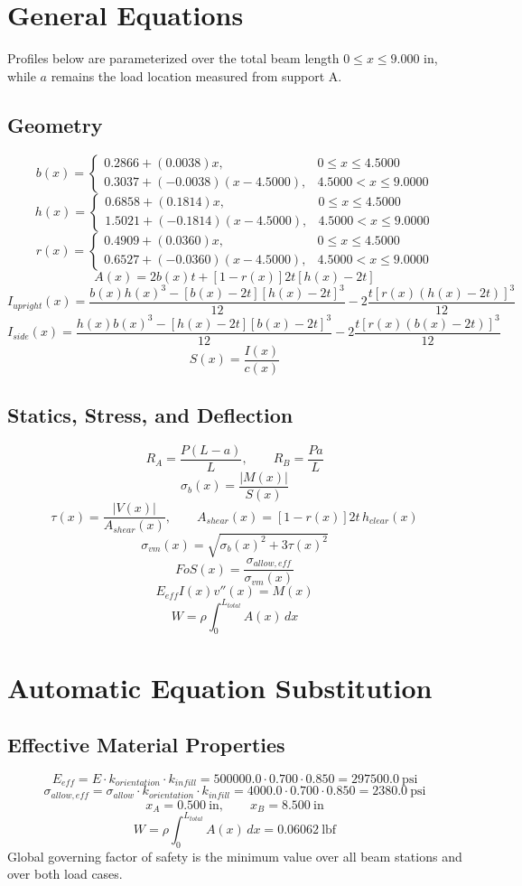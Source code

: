 \documentclass[11pt]{article}
\begin{document}
\section*{General Equations}
Profiles below are parameterized over the total beam length $0 \le x \le 9.000$ in, while $a$ remains the load location measured from support A.
\subsection*{Geometry}
\[
b(x)=\begin{cases}0.2866 + (0.0038)x, & 0 \le x \le 4.5000\\0.3037 + (-0.0038)(x-4.5000), & 4.5000 < x \le 9.0000\end{cases}
\]
\[
h(x)=\begin{cases}0.6858 + (0.1814)x, & 0 \le x \le 4.5000\\1.5021 + (-0.1814)(x-4.5000), & 4.5000 < x \le 9.0000\end{cases}
\]
\[
r(x)=\begin{cases}0.4909 + (0.0360)x, & 0 \le x \le 4.5000\\0.6527 + (-0.0360)(x-4.5000), & 4.5000 < x \le 9.0000\end{cases}
\]
\[
A(x)=2b(x)t+[1-r(x)]2t[h(x)-2t]
\]
\[
I_{upright}(x)=\frac{b(x)h(x)^3-[b(x)-2t][h(x)-2t]^3}{12}-2\frac{t[r(x)(h(x)-2t)]^3}{12}
\]
\[
I_{side}(x)=\frac{h(x)b(x)^3-[h(x)-2t][b(x)-2t]^3}{12}-2\frac{t[r(x)(b(x)-2t)]^3}{12}
\]
\[
S(x)=\frac{I(x)}{c(x)}
\]

\subsection*{Statics, Stress, and Deflection}
\[
R_A=\frac{P(L-a)}{L}, \qquad R_B=\frac{Pa}{L}
\]
\[
\sigma_b(x)=\frac{|M(x)|}{S(x)}
\]
\[
\tau(x)=\frac{|V(x)|}{A_{shear}(x)}, \qquad A_{shear}(x)=[1-r(x)]2t\,h_{clear}(x)
\]
\[
\sigma_{vm}(x)=\sqrt{\sigma_b(x)^2+3\tau(x)^2}
\]
\[
FoS(x)=\frac{\sigma_{allow,eff}}{\sigma_{vm}(x)}
\]
\[
E_{eff}I(x)v''(x)=M(x)
\]
\[
W=\rho\int_0^{L_{total}} A(x)\,dx
\]

\section*{Automatic Equation Substitution}
\subsection*{Effective Material Properties}
\[E_{eff} = E \cdot k_{orientation} \cdot k_{infill} = 500000.0 \cdot 0.700 \cdot 0.850 = 297500.0\ \mathrm{psi}\]
\[\sigma_{allow,eff} = \sigma_{allow} \cdot k_{orientation} \cdot k_{infill} = 4000.0 \cdot 0.700 \cdot 0.850 = 2380.0\ \mathrm{psi}\]
\[x_A = 0.500\ \mathrm{in}, \qquad x_B = 8.500\ \mathrm{in}\]
\[W = \rho \int_0^{L_{total}} A(x)\,dx = 0.06062\ \mathrm{lbf}\]
Global governing factor of safety is the minimum value over all beam stations and over both load cases.
\end{document}
